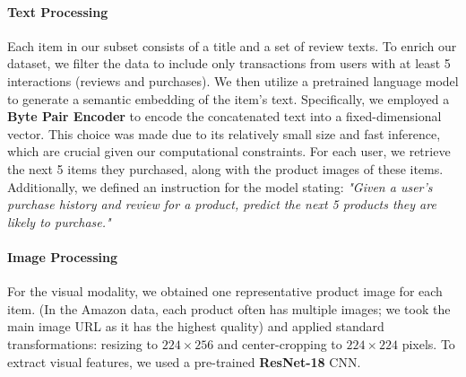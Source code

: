 \documentclass[conference]{IEEEtran}
\begin{document}

\paragraph{Text Processing} Each item in our subset consists of a title and a set of review texts. To enrich our dataset, we filter the data to include only transactions from users with at least 5 interactions (reviews and purchases). We then utilize a pretrained language model to generate a semantic embedding of the item's text. Specifically, we employed a \textbf{Byte Pair Encoder} to encode the concatenated text into a fixed-dimensional vector. This choice was made due to its relatively small size and fast inference, which are crucial given our computational constraints. For each user, we retrieve the next 5 items they purchased, along with the product images of these items. Additionally, we defined an instruction for the model stating: \textit{"Given a user's purchase history and review for a product, predict the next 5 products they are likely to purchase."}


\paragraph{Image Processing} For the visual modality, we obtained one representative product image for each item. (In the Amazon data, each product often has multiple images; we took the main image URL as it has the highest quality) and applied standard transformations: resizing to $224\times256$ and center-cropping to $224\times224$ pixels. To extract visual features, we used a pre-trained \textbf{ResNet-18} CNN.
\end{document}
